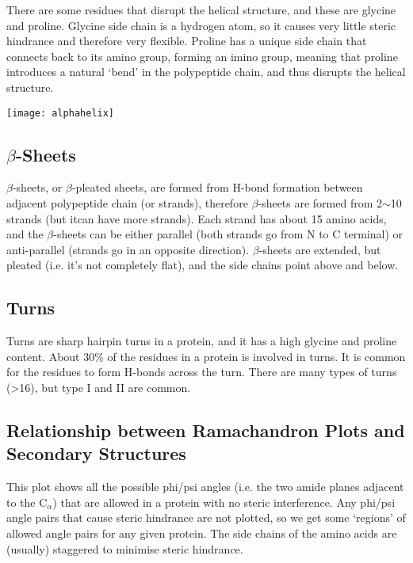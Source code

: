 \documentclass[a4paper, 12pt]{report}
\begin{document}
There are some residues that disrupt the helical structure, and these are glycine and proline.
Glycine side chain is a hydrogen atom, so it causes very little steric hindrance and therefore very flexible.
Proline has a unique side chain that connects back to its amino group, forming an imino group, meaning that proline introduces a natural `bend' in the polypeptide chain, and thus disrupts the helical structure.

\begin{center}
\texttt{[image: alphahelix]}
\end{center}

\subsection{$\beta$-Sheets}

$\beta$-sheets, or $\beta$-pleated sheets, are formed from H-bond formation between adjacent polypeptide chain (or strands), therefore $\beta$-sheets are formed from 2$\sim$10 strands (but itcan have more strands).
Each strand has about 15 amino acids, and the $\beta$-sheets can be either parallel (both strands go from N to C terminal) or anti-parallel (strands go in an opposite direction).
$\beta$-sheets are extended, but pleated (i.e. it's not completely flat), and the side chains point above and below.

\subsection{Turns}

Turns are sharp hairpin turns in a protein, and it has a high glycine and proline content.
About 30\% of the residues in a protein is involved in turns.
It is common for the residues to form H-bonds across the turn.
There are many types of turns (\textgreater16), but type I and II are common.

\subsection{Relationship between Ramachandron Plots and Secondary Structures}


This plot shows all the possible phi/psi angles (i.e. the two amide planes adjacent to the C$_{\alpha}$) that are allowed in a protein with no steric interference.
Any phi/psi angle pairs that cause steric hindrance are not plotted, so we get some `regions' of allowed angle pairs for any given protein.
The side chains of the amino acids are (usually) staggered to minimise steric hindrance.
\end{document}
